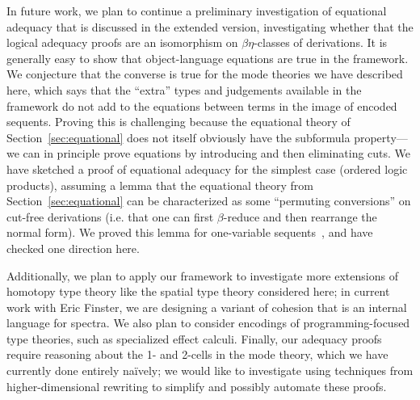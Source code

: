 \documentclass[a4paper,USenglish]{lipics-v2016}
\newcommand\citep[1]{\cite{#1}}
\begin{document}
In future work, we plan to continue a preliminary investigation of
equational adequacy that is discussed in the extended version,
investigating whether that the logical adequacy proofs are an
isomorphism on $\beta\eta$-classes of derivations.  It is generally easy
to show that object-language equations are true in the framework.  We
conjecture that the converse is true for the mode theories we have
described here, which says that the ``extra'' types and judgements
available in the framework do not add to the equations between terms in
the image of encoded sequents.  
Proving this is challenging because the
equational theory of Section~\ref{sec:equational} does not itself
obviously have the subformula property---we can in principle prove
equations by introducing and then eliminating cuts.  We have sketched a
proof of equational adequacy for the simplest case (ordered logic
products), assuming a lemma that the equational theory from
Section~\ref{sec:equational} can be characterized as some ``permuting
conversions'' on cut-free derivations (i.e. that one can first
$\beta$-reduce and then rearrange the normal form).  We proved this
lemma for one-variable sequents~\citep{ls16adjoint}, and have checked
one direction here.

Additionally, we plan to apply our framework to investigate more
extensions of homotopy type theory like the spatial type theory
considered here; in current work with Eric Finster, we are designing a
variant of cohesion that is an internal language for spectra.  We also
plan to consider encodings of programming-focused type theories, such as
specialized effect calculi.  Finally, our adequacy proofs require
reasoning about the 1- and 2-cells in the mode theory, which we have
currently done entirely na\"ively; we would like to investigate using
techniques from higher-dimensional rewriting to simplify and possibly
automate these proofs.



\end{document}
